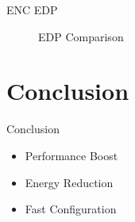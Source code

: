 \documentclass[t]{beamer}
\begin{document}
\begin{frame}{ENC EDP}
	\begin{figure}
		\begin{center}
		\end{center}
		\caption{EDP Comparison}
		\label{fig:EDP}
	\end{figure}
\end{frame}

\section{Conclusion}
\begin{frame}{Conclusion}
    \begin{itemize}
        \item Performance Boost
        \item Energy Reduction
		\item Fast Configuration
    \end{itemize}
\end{frame}
\end{document}
